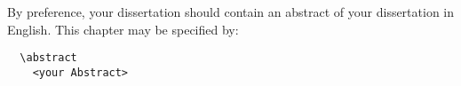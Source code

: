 \abstract
By preference, your dissertation should contain
an abstract of your dissertation in English.
This chapter may be specified by:
\begin{verbatim}
  \abstract
    <your Abstract>
\end{verbatim}

